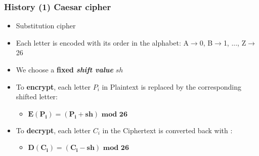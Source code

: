 \documentclass[
hyperref={pdfpagelabels=false}
,xcolor=table
]
{beamer}
\begin{document}



  
  



  


\begin{frame}
  \frametitle{History (1) Caesar cipher}

  \begin{itemize}
  \item Substitution cipher
  \item Each letter is encoded with its order in the alphabet: A$\rightarrow$0, B$\rightarrow$1, ..., Z$\rightarrow$26
  \item We choose a \textbf{fixed \textit{shift value}} $sh$
  \item To \textbf{encrypt}, each letter $P_i$ in Plaintext is replaced by the corresponding shifted letter:
    \begin{itemize}
    \item[] $\bm{E(P_i) = (P_i + sh) \mbox{ mod } 26}$
    \end{itemize}
  \item To \textbf{decrypt}, each letter $C_i$ in the Ciphertext is converted back with :
    \begin{itemize}
    \item[] $\bm{D(C_i) = (C_i - sh) \mbox{ mod } 26}$ 
    \end{itemize}
  \end{itemize}

  
\end{frame}
\end{document}
